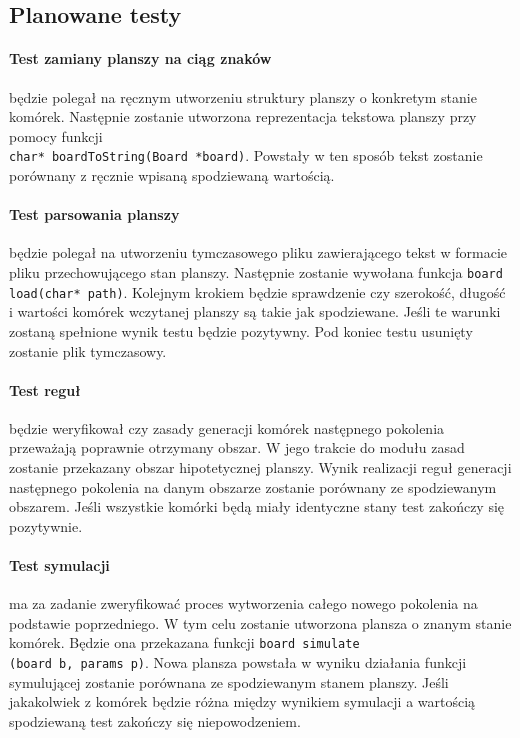 \documentclass{article}
\begin{document}
\subsection{Planowane testy}

\paragraph{Test zamiany planszy na ciąg znaków} będzie polegał na ręcznym utworzeniu struktury planszy o konkretym stanie komórek. Następnie zostanie utworzona reprezentacja tekstowa planszy przy pomocy funkcji \\ \texttt{char* boardToString(Board *board)}. Powstały w ten sposób tekst zostanie porównany z ręcznie wpisaną spodziewaną wartością.

\paragraph{Test parsowania planszy} będzie polegał na utworzeniu tymczasowego pliku zawierającego tekst w formacie pliku przechowującego stan planszy. Następnie zostanie wywołana funkcja \texttt{board load(char* path)}. Kolejnym krokiem będzie sprawdzenie czy szerokość, długość i wartości komórek wczytanej planszy są takie jak spodziewane. Jeśli te warunki zostaną spełnione wynik testu będzie pozytywny. Pod koniec testu usunięty zostanie plik tymczasowy.

\paragraph{Test reguł} będzie weryfikował czy zasady generacji komórek następnego pokolenia przeważają poprawnie otrzymany obszar. W jego trakcie do modułu zasad zostanie przekazany obszar hipotetycznej planszy. Wynik realizacji reguł generacji następnego pokolenia na danym obszarze zostanie porównany ze spodziewanym obszarem. Jeśli wszystkie komórki będą miały identyczne stany test zakończy się pozytywnie.

\paragraph{Test symulacji} ma za zadanie zweryfikować proces wytworzenia całego nowego pokolenia na podstawie poprzedniego. W tym celu zostanie utworzona plansza o znanym stanie komórek. Będzie ona przekazana funkcji \texttt{board simulate\\(board b, params p)}. Nowa plansza powstała w wyniku działania funkcji symulującej zostanie porównana ze spodziewanym stanem planszy. Jeśli jakakolwiek z komórek będzie różna między wynikiem symulacji a wartością spodziewaną test zakończy się niepowodzeniem.
\end{document}
